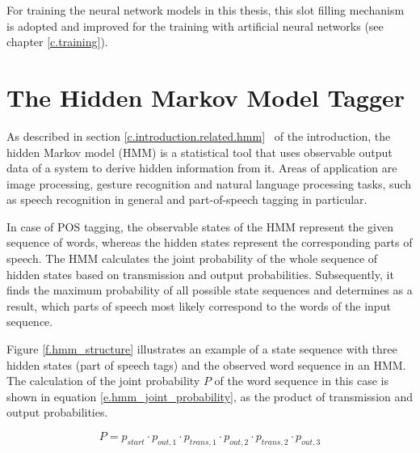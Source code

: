 For training the neural network models in this thesis, this slot filling mechanism is adopted and improved for the training with artificial neural networks (see chapter \ref{c.training}).

\section{The Hidden Markov Model Tagger}\label{c.alex.hmm}
As described in section \ref{c.introduction.related.hmm} \ of the introduction, the hidden Markov model (HMM) is a statistical tool that uses observable output data of a system to derive hidden information from it. Areas of application are image processing, gesture recognition and natural language processing tasks, such as speech recognition in general and part-of-speech tagging in particular.

In case of POS tagging, the observable states of the HMM represent the given sequence of words, whereas the hidden states represent the corresponding parts of speech. The HMM calculates the joint probability of the whole sequence of hidden states based on transmission and output probabilities. Subsequently, it finds the maximum probability of all possible state sequences and determines as a result, which parts of speech most likely correspond to the words of the input sequence.

Figure \ref{f.hmm_structure} illustrates an example of a state sequence with three hidden states (part of speech tags) and the observed word sequence in an HMM. The calculation of the joint probability $P$ of the word sequence in this case is shown in equation \ref{e.hmm_joint_probability}, as the product of transmission and output probabilities.

\begin{equation}
    P = p_{start}\cdot p_{out,1}\cdot p_{trans,1}\cdot p_{out,2}\cdot p_{trans,2}\cdot p_{out,3} \label{e.hmm_joint_probability}
\end{equation}

